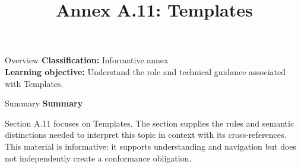 \documentclass[10pt,letterpaper]{article}
\title{Annex A.11: Templates}
\author{}
\date{}
\begin{document}
\maketitle
\begin{CornellOverviewBox}{Overview}
\textbf{Classification:} Informative annex\\[2pt]
\textbf{Learning objective:} Understand the role and technical guidance associated with Templates.
\end{CornellOverviewBox}\begin{CornellSummaryBox}{Summary}
{\sffamily\bfseries\color{Accent} Summary}\par\vspace{3pt}Section A.11 focuses on Templates. The section supplies the rules and semantic distinctions needed to interpret this topic in context with its cross-references. This material is informative: it supports understanding and navigation but does not independently create a conformance obligation.
\end{CornellSummaryBox}
\end{document}
